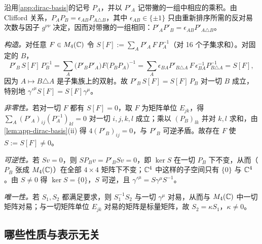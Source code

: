 \documentclass[UTF8,a4paper,11pt,fontset=fandol]{ctexart}
\makeatletter
\let\amsmathbb\mathbb
\renewcommand{\mathbb}[1]{\ifx1#1\mathds{1}\else\amsmathbb{#1}\fi}
\theoremstyle{cplain}
\theoremstyle{cdefinition}
\theoremstyle{cremark}
\renewcommand{\proofname}{证明}
\renewenvironment{proof}[1][\proofname]{\par\pushQED{\qed}\normalfont\topsep6\p@\@plus6\p@\relax
  \trivlist\item[\hskip\labelsep\itshape #1\hspace{0.5em}]\ignorespaces}{\popQED\endtrivlist\@endpefalse}
\numberwithin{equation}{section}
\makeatother
\begin{document}
\begin{proof}
沿用\cref{app:dirac-basis}的记号 $P_A$，并以 $P'_A$ 记带撇的一组中相应的乘积。由 Clifford 关系，$P_AP_B=\epsilon_{AB}P_{A\triangle B}$，其中 $\epsilon_{AB}\in\{\pm1\}$ 只由重新排序所需的反对易次数与因子 $g^{\nu\nu}$ 决定，因而对带撇的一组相同：$P'_AP'_B=\epsilon_{AB}P'_{A\triangle B}$。

\emph{构造。}对任意 $F\in M_4(\mathbb C)$ 令 $S[F]:=\sum_AP'_A\,F\,P_A^{-1}$（对 16 个子集求和）。对固定的 $B$，
\[
P'_B\,S[F]\,P_B^{-1}=\sum_A\bigl(P'_BP'_A\bigr)F\bigl(P_BP_A\bigr)^{-1}=\sum_A\epsilon_{BA}P'_{B\triangle A}\,F\,\epsilon_{BA}^{-1}P_{B\triangle A}^{-1}=S[F] ,
\]
因为 $A\mapsto B\triangle A$ 是子集族上的双射。故 $P'_B\,S[F]=S[F]\,P_B$ 对一切 $B$ 成立，特别地 $\gamma'^\mu S[F]=S[F]\gamma^\mu$。

\emph{非零性。}若对一切 $F$ 都有 $S[F]=0$，取 $F$ 为矩阵单位 $E_{jk}$，得 $\sum_A(P'_A)_{ij}(P_A^{-1})_{kl}=0$ 对一切 $i,j,k,l$ 成立；乘以 $(P_B)_{lk}$ 并对 $k,l$ 求和，由\cref{lem:app-dirac-basis}(ii) 得 $4(P'_B)_{ij}=0$，与 $P'_B$ 可逆矛盾。故存在 $F$ 使 $S:=S[F]\neq0$。

\emph{可逆性。}若 $Sv=0$，则 $SP_Bv=P'_BSv=0$，即 $\ker S$ 在一切 $P_B$ 下不变，从而（$P_B$ 张成 $M_4(\mathbb C)$）在全部 $4\times4$ 矩阵下不变；$\mathbb C^4$ 中这样的子空间只有 $\{0\}$ 与 $\mathbb C^4$。由 $S\neq0$ 得 $\ker S=\{0\}$，$S$ 可逆，且 $\gamma'^\mu=S\gamma^\mu S^{-1}$。

\emph{唯一性。}若 $S_1,S_2$ 都满足要求，则 $S_1^{-1}S_2$ 与一切 $\gamma^\mu$ 对易，从而与 $M_4(\mathbb C)$ 中一切矩阵对易；与一切矩阵单位 $E_{jk}$ 对易的矩阵是标量矩阵，故 $S_2=\kappa S_1$，$\kappa\neq0$。
\end{proof}

\subsection{哪些性质与表示无关}\label{app:dirac-repindep}
\end{document}
